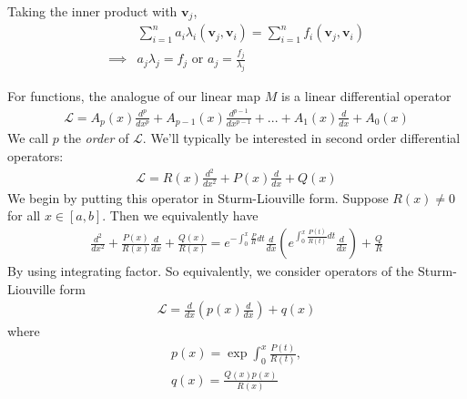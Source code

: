 \documentclass[a4paper]{article}
\begin{document}
Taking the inner product with $\mathbf{v}_j$,
\begin{equation*}
\begin{aligned}
&\sum_{i=1}^n a_i \lambda_i \left(\mathbf{v}_j,\mathbf{v}_i\right) = \sum_{i=1}^n f_i \left(\mathbf{v}_j,\mathbf{v}_i\right)\\
\implies & a_j\lambda_j = f_j \text{ or } a_j = \frac{f_j}{\lambda_j}
\end{aligned}
\end{equation*}

For functions, the analogue of our linear map $M$ is a linear differential operator
\begin{equation*}
\begin{aligned}
\mathcal{L} = A_p\left(x\right) \frac{d^p}{dx^p} + A_{p-1}\left(x\right) \frac{d^{p-1}}{dx^{p-1}} + ... + A_1\left(x\right) \frac{d}{dx} + A_0\left(x\right)
\end{aligned}
\end{equation*}
We call $p$ the \emph{order} of $\mathcal{L}$. We'll typically be interested in second order differential operators:
\begin{equation*}
\begin{aligned}
\mathcal{L} = R\left(x\right)\frac{d^2}{dx^2} + P\left(x\right) \frac{d}{dx} + Q\left(x\right)
\end{aligned}
\end{equation*}
We begin by putting this operator in Sturm-Liouville form. Suppose $R\left(x\right) \neq 0$ for all $x \in \left[a,b\right]$. Then we equivalently have
\begin{equation*}
\begin{aligned}
\frac{d^2}{dx^2} + \frac{P\left(x\right)}{R\left(x\right)}\frac{d}{dx} + \frac{Q\left(x\right)}{R\left(x\right)} = e^{-\int_0^x \frac{P}{R} dt} \frac{d}{dx}\left(e^{\int_0^x \frac{P\left(t\right)}{R\left(t\right)} dt} \frac{d}{dx}\right) + \frac{Q}{R}
\end{aligned}
\end{equation*}
By using integrating factor. So equivalently, we consider operators of the Sturm-Liouville form
\begin{equation*}
\begin{aligned}
\mathcal{L} = \frac{d}{dx}\left(p\left(x\right)\frac{d}{dx}\right) + q\left(x\right)
\end{aligned}
\end{equation*}
where
\begin{equation*}
\begin{aligned}
p\left(x\right) = \exp\int_0^x \frac{P\left(t\right)}{R\left(t\right)},\\
q\left(x\right) = \frac{Q\left(x\right) p \left(x\right)}{R\left(x\right)}
\end{aligned}
\end{equation*}
\end{document}
